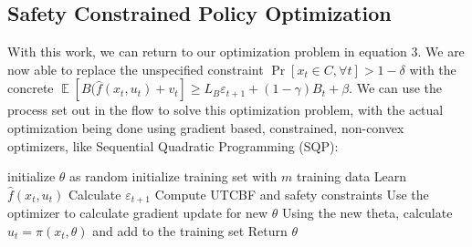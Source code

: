 \documentclass{article}
\newcommand{\eps}{\varepsilon}
\DeclareMathOperator*{\E}{\mathbb{E}}
\begin{document}
\subsection{Safety Constrained Policy Optimization}
With this work, we can return to our optimization problem in equation 3. We are now able to replace the unspecified constraint $\Pr[x_t\in C, \forall t] > 1 - \delta$ with the concrete $\E[B(\hat{f}(x_t, u_t) + v_t] \geq L_B\eps_{t + 1} + (1 - \gamma)B_t + \beta$. We can use the process set out in the flow to solve this optimization problem, with the actual optimization being done using gradient based, constrained, non-convex optimizers, like Sequential Quadratic Programming (SQP): \\
\begin{algorithmic}[1]
    \State initialize $\theta$ as random
    \State initialize training set with $m$ training data
    \State Learn $\hat{f}(x_t, u_t)$
    \State Calculate $\eps_{t + 1}$
    \State Compute UTCBF and safety constraints
    \State Use the optimizer to calculate gradient update for new $\theta$
    \State Using the new theta, calculate $u_t = \pi(x_t, \theta)$ and add to the training set
    \EndWhile
    \State Return $\theta$
\end{algorithmic}
\end{document}
